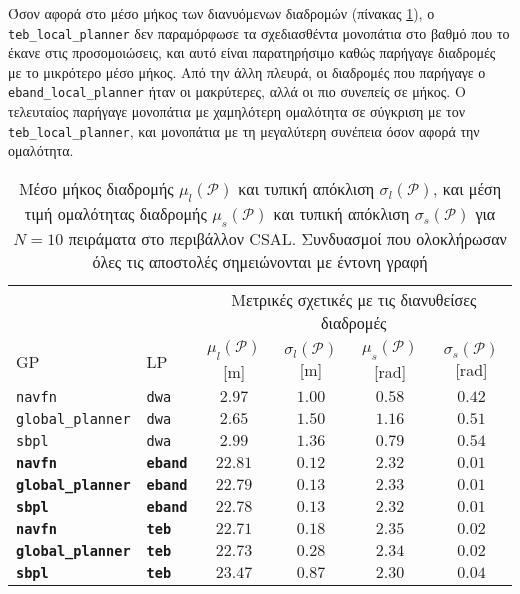 Όσον αφορά στο μέσο μήκος των διανυόμενων διαδρομών
(πίνακας \ref{tbl:info_ground_truth_csal}), ο \texttt{teb\_local\_planner} δεν
παραμόρφωσε τα σχεδιασθέντα μονοπάτια στο βαθμό που το έκανε στις
προσομοιώσεις, και αυτό είναι παρατηρήσιμο καθώς παρήγαγε διαδρομές με το
μικρότερο μέσο μήκος. Από την άλλη πλευρά, οι διαδρομές που παρήγαγε ο
\texttt{eband\_local\_planner} ήταν οι μακρύτερες, αλλά οι πιο συνεπείς σε μήκος.
Ο τελευταίος παρήγαγε μονοπάτια με χαμηλότερη ομαλότητα σε σύγκριση με τον
\texttt{teb\_local\_planner}, και μονοπάτια με τη μεγαλύτερη συνέπεια όσον αφορά
την ομαλότητα.

\begin{table}[h]
\renewcommand{\arraystretch}{1.3}
\begin{tabular}{llcccc}
& & \multicolumn{4}{c}{Μετρικές σχετικές με τις διανυθείσες διαδρομές} \\
\cline{3-6}
  GP & LP & $\mu_{l}(\bm{\mathcal{P}})$ [m] & $\sigma_{l}(\bm{\mathcal{P}})$ [m] & $\mu_{s}(\bm{\mathcal{P}})$ [rad] & $\sigma_{s}(\bm{\mathcal{P}})$ [rad] \\ \toprule
  \texttt{navfn} & \texttt{dwa} & $2.97$ & $1.00$ & $0.58$ & $0.42$ \\
  \texttt{global\_planner} & \texttt{dwa} & $2.65$ & $1.50$ & $1.16$ & $0.51$ \\
  \texttt{sbpl} & \texttt{dwa} & $2.99$ & $1.36$ & $0.79$ & $0.54$ \\
  \textbf{\texttt{navfn}} & \textbf{\texttt{eband}} & $\bm{22.81}$ & $\bm{0.12}$ & $\bm{2.32}$ & $\bm{0.01}$ \\
  \textbf{\texttt{global\_planner}} & \textbf{\texttt{eband}} & $\bm{22.79}$ & $\bm{0.13}$ & $\bm{2.33}$ & $\bm{0.01}$ \\
  \textbf{\texttt{sbpl}} & \textbf{\texttt{eband}} & $\bm{22.78}$ & $\bm{0.13}$ & $\bm{2.32}$ & $\bm{0.01}$ \\
  \textbf{\texttt{navfn}} & \textbf{\texttt{teb}} & $\bm{22.71}$ & $\bm{0.18}$ & $\bm{2.35}$ & $\bm{0.02}$ \\
  \textbf{\texttt{global\_planner}} & \textbf{\texttt{teb}} & $\bm{22.73}$ & $\bm{0.28}$ & $\bm{2.34}$ & $\bm{0.02}$ \\
  \textbf{\texttt{sbpl}} & \textbf{\texttt{teb}} & $\bm{23.47}$ & $\bm{0.87}$ & $\bm{2.30}$ & $\bm{0.04}$ \\ \bottomrule
\end{tabular}
\caption{\small Μέσο μήκος διαδρομής $\mu_{l}(\bm{\mathcal{P}})$ και τυπική
         απόκλιση $\sigma_{l}(\bm{\mathcal{P}})$, και μέση τιμή ομαλότητας
         διαδρομής $\mu_{s}(\bm{\mathcal{P}})$ και τυπική απόκλιση
         $\sigma_{s}(\bm{\mathcal{P}})$ για $N=10$ πειράματα στο περιβάλλον
         CSAL. Συνδυασμοί που ολοκλήρωσαν όλες τις αποστολές  σημειώνονται
         με έντονη γραφή}
\label{tbl:info_ground_truth_csal}
\end{table}

